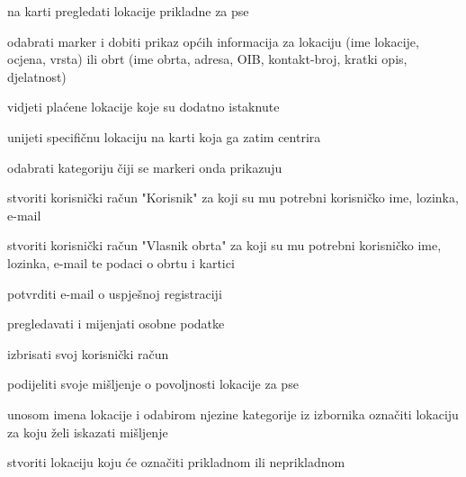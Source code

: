 			
			\begin{packed_enum}
				\item  {}
				
				\begin{packed_enum}
					
					\item na karti pregledati lokacije prikladne za pse 
					\item odabrati marker i dobiti prikaz općih informacija za lokaciju (ime lokacije, ocjena, vrsta) ili obrt (ime obrta, adresa, OIB, kontakt-broj, kratki opis, djelatnost)
                    \item vidjeti plaćene lokacije koje su dodatno istaknute
					\item unijeti specifičnu lokaciju na karti koja ga zatim centrira
					\item odabrati kategoriju čiji se markeri onda prikazuju
					\item stvoriti korisnički račun "Korisnik" za koji su mu potrebni korisničko ime, lozinka, e-mail
                    \item stvoriti korisnički račun "Vlasnik obrta" za koji su mu potrebni korisničko ime, lozinka, e-mail te podaci o obrtu i kartici
					
				\end{packed_enum}
			
				\item  {}
				
				\begin{packed_enum}
					
					\item potvrditi e-mail o uspješnoj registraciji
					\item pregledavati i mijenjati osobne podatke
					\item izbrisati svoj korisnički račun 
					\item podijeliti svoje mišljenje o povoljnosti lokacije za pse
					\item unosom imena lokacije i odabirom njezine kategorije iz izbornika označiti lokaciju za koju želi iskazati mišljenje
					\item stvoriti lokaciju koju će označiti prikladnom ili neprikladnom
					
				\end{packed_enum}
				
				\item  {}
				

\end{packed_enum}
